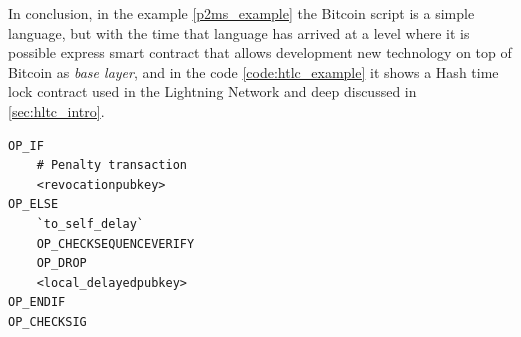 In conclusion, in the example \ref{p2ms_example} the Bitcoin script is a simple
language, but with the time that language has arrived at a level where it is possible
express smart contract that allows development new technology on top of Bitcoin as \emph{base layer},
and in the code \ref{code:htlc_example} it shows a Hash time lock contract used in the Lightning Network 
and deep discussed in \ref{sec:hltc_intro}.


\begin{lstlisting}[language=bitcoinscript, caption={Hash Time Lock contract first example.}, label={code:htlc_example}]
OP_IF
    # Penalty transaction
    <revocationpubkey>
OP_ELSE
    `to_self_delay`
    OP_CHECKSEQUENCEVERIFY
    OP_DROP
    <local_delayedpubkey>
OP_ENDIF
OP_CHECKSIG
\end{lstlisting}



